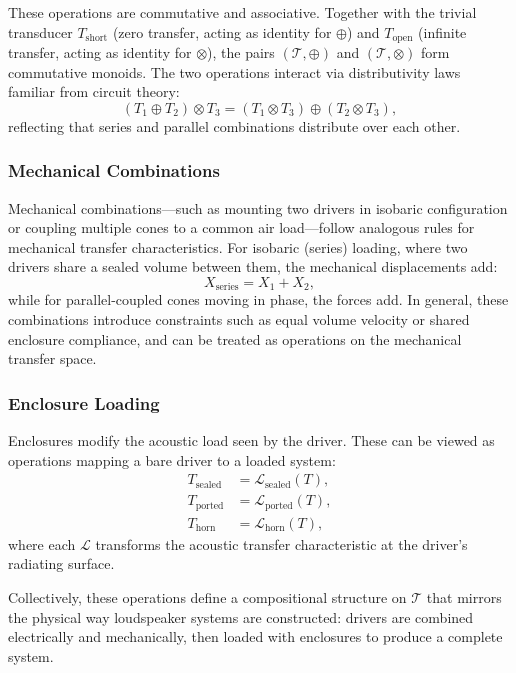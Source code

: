 These operations are commutative and associative. Together with the trivial transducer $T_{\text{short}}$ (zero transfer, acting as identity for $\oplus$) and $T_{\text{open}}$ (infinite transfer, acting as identity for $\otimes$), the pairs $(\mathcal{T}, \oplus)$ and $(\mathcal{T}, \otimes)$ form commutative monoids. The two operations interact via distributivity laws familiar from circuit theory:
\[
(T_1 \oplus T_2) \otimes T_3 = (T_1 \otimes T_3) \oplus (T_2 \otimes T_3),
\]
reflecting that series and parallel combinations distribute over each other.

\subsubsection*{Mechanical Combinations}

Mechanical combinations—such as mounting two drivers in isobaric configuration or coupling multiple cones to a common air load—follow analogous rules for mechanical transfer characteristics. For isobaric (series) loading, where two drivers share a sealed volume between them, the mechanical displacements add:
\[
X_{\text{series}} = X_1 + X_2,
\]
while for parallel-coupled cones moving in phase, the forces add. In general, these combinations introduce constraints such as equal volume velocity or shared enclosure compliance, and can be treated as operations on the mechanical transfer space.

\subsubsection*{Enclosure Loading}

Enclosures modify the acoustic load seen by the driver. These can be viewed as operations mapping a bare driver to a loaded system:
\[
\begin{aligned}
T_{\text{sealed}} &= \mathcal{L}_{\text{sealed}}(T), \\
T_{\text{ported}} &= \mathcal{L}_{\text{ported}}(T), \\
T_{\text{horn}} &= \mathcal{L}_{\text{horn}}(T),
\end{aligned}
\]
where each $\mathcal{L}$ transforms the acoustic transfer characteristic at the driver's radiating surface.

Collectively, these operations define a compositional structure on $\mathcal{T}$ that mirrors the physical way loudspeaker systems are constructed: drivers are combined electrically and mechanically, then loaded with enclosures to produce a complete system.

